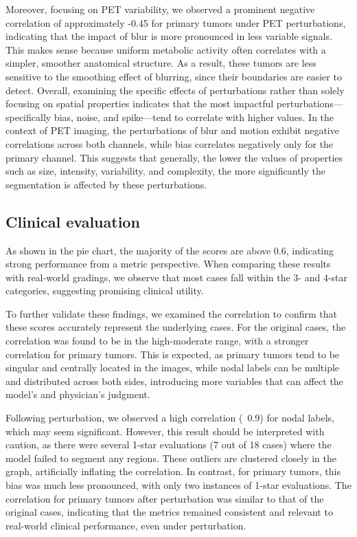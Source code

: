 Moreover, focusing on PET variability, we observed a prominent negative correlation of approximately -0.45 for primary tumors under PET perturbations, indicating that the impact of blur is more pronounced in less variable signals. 
This makes sense because uniform metabolic activity often correlates with a simpler, smoother anatomical structure. As a result, these tumors are less sensitive to the smoothing effect of blurring, since their boundaries are easier to detect. 
Overall, examining the specific effects of perturbations rather than solely focusing on spatial properties indicates that the most impactful perturbations—specifically bias, noise, and spike—tend to correlate with higher values. In the context of PET imaging, the perturbations of blur and motion exhibit negative correlations across both channels, while bias correlates negatively only for the primary channel. This suggests that generally, the lower the values of properties such as size, intensity, variability, and complexity, the more significantly the segmentation is affected by these perturbations.

\newpage
\subsection{Clinical evaluation}
As shown in the pie chart, the majority of the scores are above 0.6, indicating strong performance from a metric perspective. When comparing these results with real-world gradings, we observe that most cases fall within the 3- and 4-star categories, suggesting promising clinical utility.

To further validate these findings, we examined the correlation to confirm that these scores accurately represent the underlying cases. For the original cases, the correlation was found to be in the high-moderate range, with a stronger correlation for primary tumors. This is expected, as primary tumors tend to be singular and centrally located in the images, while nodal labels can be multiple and distributed across both sides, introducing more variables that can affect the model's and physician's judgment.

Following perturbation, we observed a high correlation (~0.9) for nodal labels, which may seem significant. However, this result should be interpreted with caution, as there were several 1-star evaluations (7 out of 18 cases) where the model failed to segment any regions. These outliers are clustered closely in the graph, artificially inflating the correlation. In contrast, for primary tumors, this bias was much less pronounced, with only two instances of 1-star evaluations. The correlation for primary tumors after perturbation was similar to that of the original cases, indicating that the metrics remained consistent and relevant to real-world clinical performance, even under perturbation.

